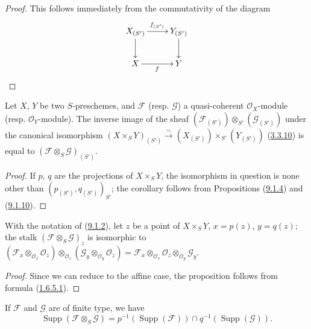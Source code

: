 \begin{proof}
This follows immediately from the commutativity of the diagram
\[
  \xymatrix{
    X_{(S')}\ar[r]^{f_{(S')}}\ar[d] &
    Y_{(S')}\ar[d]\\
    X\ar[r]_f &
    Y
  }
\]
\end{proof}

\begin{corollary}[9.1.11]
\label{I.9.1.11}
Let $X$, $Y$ be two $S$-preschemes, and $\mathscr{F}$ \textup{(resp. $\mathscr{G}$)}
a quasi-coherent $\mathscr{O}_X$-module \textup{(resp.} $\mathscr{O}_Y$-module).
The inverse image of the sheaf
$(\mathscr{F}_{(S')})\otimes_{S'}(\mathscr{G}_{(S')})$ under the canonical
isomorphism
$(X\times_S Y)_{(S')}\xrightarrow{\sim}
(X_{(S')})\times_{S'}(Y_{(S')})$
\textup{(\hyperref[I.3.3.10]{3.3.10})} is equal to
$(\mathscr{F}\otimes_S\mathscr{G})_{(S')}$.
\end{corollary}

\begin{proof}
If $p$, $q$ are the projections of $X\times_S Y$, the isomorphism in
question is none other than $(p_{(S')},q_{(S')})_{S'}$; the corollary
follows from Propositions (\hyperref[I.9.1.4]{9.1.4}) and
(\hyperref[I.9.1.10]{9.1.10}).
\end{proof}

\begin{proposition}[9.1.12]
\label{I.9.1.12}
With the notation of \textup{(\hyperref[I.9.1.2]{9.1.2})}, let $z$ be a point of
$X\times_S Y$, $x=p(z)$, $y=q(z)$; the stalk
$(\mathscr{F}\otimes_S\mathscr{G})_z$ is isomorphic to
$(\mathscr{F}_x\otimes_{\mathscr{O}_x}\mathscr{O}_z)
\otimes_{\mathscr{O}_z}
(\mathscr{G}_y\otimes_{\mathscr{O}_y}\mathscr{O}_z)
=\mathscr{F}_x\otimes_{\mathscr{O}_x}\mathscr{O}_z
\otimes_{\mathscr{O}_y}\mathscr{G}_y$.
\end{proposition}

\begin{proof}
Since we can reduce to the affine case, the proposition follows from
formula (\hyperref[I.1.6.5.1]{1.6.5.1}).
\end{proof}

\begin{corollary}[9.1.13]
\label{I.9.1.13}
If $\mathscr{F}$ and $\mathscr{G}$ are of finite type, we have
\[
  \operatorname{Supp}(\mathscr{F}\otimes_S\mathscr{G})
  =p^{-1}(\operatorname{Supp}(\mathscr{F}))
  \cap q^{-1}(\operatorname{Supp}(\mathscr{G})).
\]
\end{corollary}

